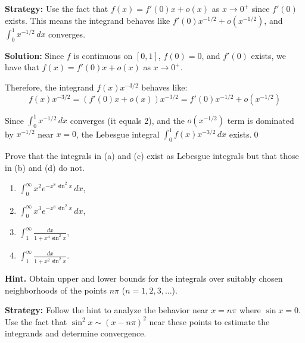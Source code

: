 \noindent\textbf{Strategy:} Use the fact that $f(x) = f'(0)x + o(x)$ as $x \to 0^+$ since $f'(0)$ exists. This means the integrand behaves like $f'(0)x^{-1/2} + o(x^{-1/2})$, and $\int_0^1 x^{-1/2} \, dx$ converges.

\bigskip\noindent\textbf{Solution:}
Since $f$ is continuous on $[0, 1]$, $f(0) = 0$, and $f'(0)$ exists, we have that $f(x) = f'(0)x + o(x)$ as $x \to 0^+$.

Therefore, the integrand $f(x)x^{-3/2}$ behaves like:
\[f(x)x^{-3/2} = (f'(0)x + o(x))x^{-3/2} = f'(0)x^{-1/2} + o(x^{-1/2})\]

Since $\int_{0}^{1} x^{-1/2} \, dx$ converges (it equals 2), and the $o(x^{-1/2})$ term is dominated by $x^{-1/2}$ near $x = 0$, the Lebesgue integral $\int_{0}^{1} f(x)x^{-3/2} \, dx$ exists.\qed


\begin{problembox}
\begin{problemstatement}
Prove that the integrals in (a) and (c) exist as Lebesgue integrals but that those in (b) and (d) do not.
\begin{enumerate}[label=(\alph*)]
\item $\int_{0}^{\infty} x^2 e^{-x^8 \sin^2 x} \, dx$,
\item $\int_{0}^{\infty} x^3 e^{-x^8 \sin^2 x} \, dx$,
\item $\int_{1}^{\infty} \frac{dx}{1 + x^4 \sin^2 x}$,
\item $\int_{1}^{\infty} \frac{dx}{1 + x^2 \sin^2 x}.$
\end{enumerate}
\textbf{Hint.} Obtain upper and lower bounds for the integrals over suitably chosen neighborhoods of the points $n\pi$ ($n = 1, 2, 3, \ldots$).
\end{problemstatement}
\end{problembox}

\noindent\textbf{Strategy:} Follow the hint to analyze the behavior near $x = n\pi$ where $\sin x = 0$. Use the fact that $\sin^2 x \sim (x - n\pi)^2$ near these points to estimate the integrands and determine convergence.

